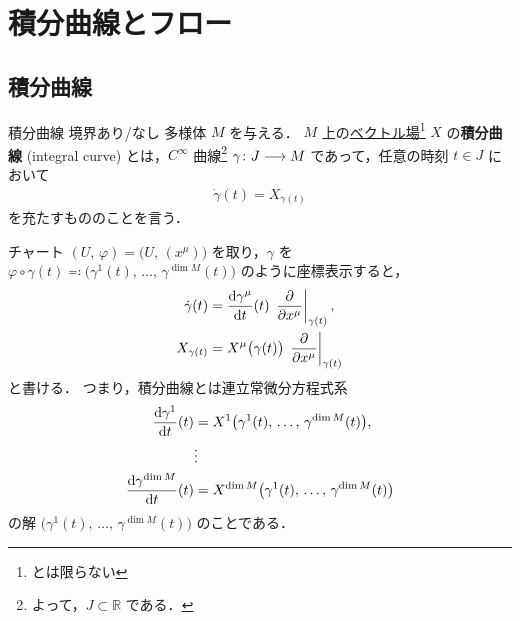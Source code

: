 \documentclass[TQFT_main]{subfiles}
\begin{document}
\section{積分曲線とフロー}

\subsection{積分曲線}

\begin{mydef}[label=def:integral-curve]{積分曲線}
    境界あり/なし \cinfty 多様体 $M$ を与える． 
    $M$ 上の\hyperref[def:vecf]{ベクトル場}\footnote{\cinfty とは限らない} $X$ の\textbf{積分曲線} (integral curve) とは，$C^\infty$ 曲線\footnote{よって，$J \subset \mathbb{R}$ である．} $\gamma \colon J \longrightarrow M$ であって，任意の時刻 $t \in J$ において
    \begin{align}
        \dot{\gamma} (t) = X_{\gamma(t)}
    \end{align}
    を充たすもののことを言う．
\end{mydef}

チャート $(U,\, \varphi) = \bigl(U,\, (x^\mu)\bigr)$ を取り，$\gamma$ を $\varphi \circ \gamma (t) \eqqcolon \bigl( \gamma^1(t),\, \dots,\, \gamma^{\dim M} (t) \bigr)$ のように座標表示すると，
\begin{align}
    \dot{\gamma} (t) &= \dv{\gamma^\mu}{t}() (t)\, \eval{\pdv{}{x^\mu}}_{\gamma(t)}, \\
    X_{\gamma (t)} &= X^\mu \bigl( \gamma(t) \bigr) \, \eval{\pdv{}{x^\mu}}_{\gamma(t)}
\end{align}
と書ける．
つまり，積分曲線とは連立常微分方程式系
\begin{align}
    \dv{\gamma^1}{t}() (t) &= X^1 \bigl( \gamma^1(t),\, \dots,\, \gamma^{\dim M}(t) \bigr) , \\
    &\vdots \\
    \dv{\gamma^{\dim M}}{t}() (t) &= X^{\dim M} \bigl( \gamma^1(t),\, \dots,\, \gamma^{\dim M}(t) \bigr)
\end{align}
の解 $\bigl( \gamma^1(t),\, \dots,\, \gamma^{\dim M} (t) \bigr)$ のことである．
\end{document}

